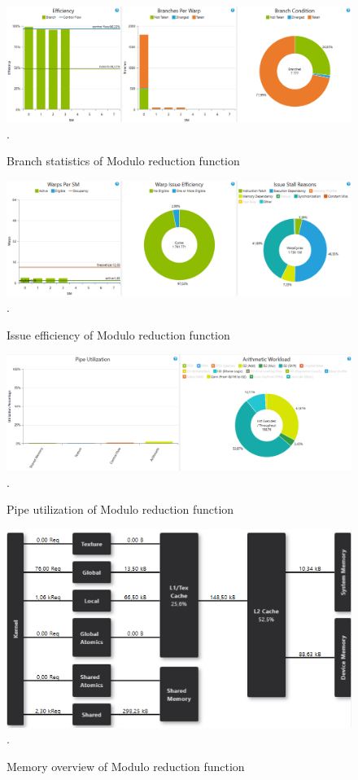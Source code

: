 \documentclass[oneside,openright,12pt,final,en]{mgr}
\begin{document}
\begin{figure}[H]
	\centering
	\includegraphics[width=\textwidth]{mod_branch}.
	\caption{Branch statistics of Modulo reduction function}
	\label{fig:mod_branch}
\end{figure}

\begin{figure}[H]
	\centering
	\includegraphics[width=\textwidth]{mod_issue}.
	\caption{Issue efficiency of Modulo reduction function}
	\label{fig:mod_issue}
\end{figure}

\begin{figure}[H]
	\centering
	\includegraphics[width=\textwidth]{mod_pipe}.
	\caption{Pipe utilization of Modulo reduction function}
	\label{fig:mod_pipe}
\end{figure}

\begin{figure}[H]
	\centering
	\includegraphics[width=\textwidth]{mod_memory}.
	\caption{Memory overview of Modulo reduction function}
	\label{fig:mod_memory}
\end{figure}
\end{document}

